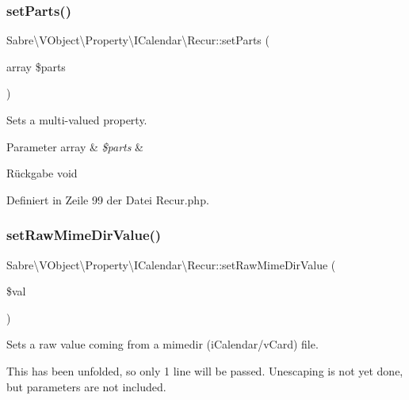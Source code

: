 \subsubsection{\texorpdfstring{set\+Parts()}{setParts()}}
{\footnotesize\ttfamily Sabre\textbackslash{}\+V\+Object\textbackslash{}\+Property\textbackslash{}\+I\+Calendar\textbackslash{}\+Recur\+::set\+Parts (\begin{DoxyParamCaption}\item[{array}]{\$parts }\end{DoxyParamCaption})}

Sets a multi-\/valued property.


\begin{DoxyParams}[1]{Parameter}
array & {\em \$parts} & \\
\hline
\end{DoxyParams}
\begin{DoxyReturn}{Rückgabe}
void 
\end{DoxyReturn}


Definiert in Zeile 99 der Datei Recur.\+php.

\mbox{\label{class_sabre_1_1_v_object_1_1_property_1_1_i_calendar_1_1_recur_ad414e79b0a13508d845b80bf44cca6f3}} 
\subsubsection{\texorpdfstring{set\+Raw\+Mime\+Dir\+Value()}{setRawMimeDirValue()}}
{\footnotesize\ttfamily Sabre\textbackslash{}\+V\+Object\textbackslash{}\+Property\textbackslash{}\+I\+Calendar\textbackslash{}\+Recur\+::set\+Raw\+Mime\+Dir\+Value (\begin{DoxyParamCaption}\item[{}]{\$val }\end{DoxyParamCaption})}

Sets a raw value coming from a mimedir (i\+Calendar/v\+Card) file.

This has been \textquotesingle{}unfolded\textquotesingle{}, so only 1 line will be passed. Unescaping is not yet done, but parameters are not included.



